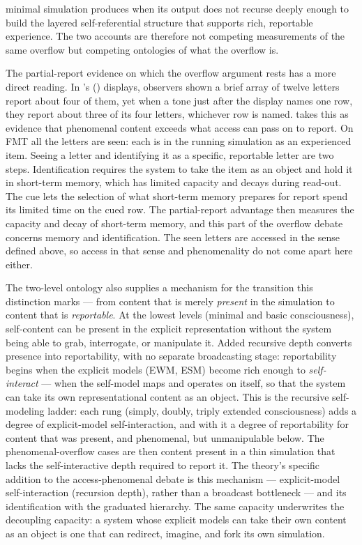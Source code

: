 \documentclass[12pt]{article}
\newcommand{\revstart}{}
\newcommand{\revend}{}
\begin{document}
minimal simulation produces when its output does not recurse deeply enough to build the layered self-referential structure that supports rich, reportable experience. The two accounts are therefore not competing measurements of the same overflow but competing ontologies of what the overflow is.

The partial-report evidence on which the overflow argument rests has a more direct reading. In \citeauthor{Sperling1960}'s (\citeyear{Sperling1960}) displays, observers shown a brief array of twelve letters report about four of them, yet when a tone just after the display names one row, they report about three of its four letters, whichever row is named. \citet{Block2007} takes this as evidence that phenomenal content exceeds what access can pass on to report. On FMT all the letters are seen: each is in the running simulation as an experienced item. Seeing a letter and identifying it as a specific, reportable letter are two steps. Identification requires the system to take the item as an object and hold it in short-term memory, which has limited capacity and decays during read-out. The cue lets the selection of what short-term memory prepares for report spend its limited time on the cued row. The partial-report advantage then measures the capacity and decay of short-term memory, and this part of the overflow debate concerns memory and identification. The seen letters are accessed in the sense defined above, so access in that sense and phenomenality do not come apart here either.

{\revstart The two-level ontology also supplies a mechanism for the transition this distinction marks --- from content that is merely \emph{present} in the simulation to content that is \emph{reportable}. At the lowest levels (minimal and basic consciousness), self-content can be present in the explicit representation without the system being able to grab, interrogate, or manipulate it. Added recursive depth converts presence into reportability, with no separate broadcasting stage: reportability begins when the explicit models (EWM, ESM) become rich enough to \emph{self-interact} --- when the self-model maps and operates on itself, so that the system can take its own representational content as an object. This is the recursive self-modeling ladder: each rung (simply, doubly, triply extended consciousness) adds a degree of explicit-model self-interaction, and with it a degree of reportability for content that was present, and phenomenal, but unmanipulable below. The phenomenal-overflow cases are then content present in a thin simulation that lacks the self-interactive depth required to report it. The theory's specific addition to the access-phenomenal debate is this mechanism --- explicit-model self-interaction (recursion depth), rather than a broadcast bottleneck --- and its identification with the graduated hierarchy. The same capacity underwrites the decoupling capacity: a system whose explicit models can take their own content as an object is one that can redirect, imagine, and fork its own simulation.\revend}
\end{document}
